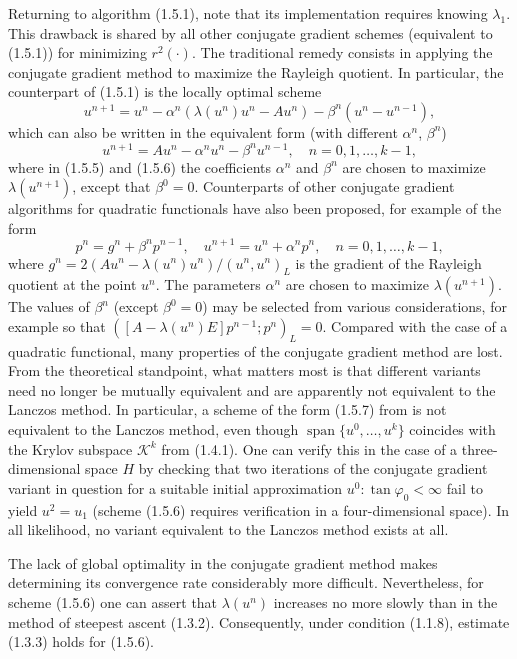 \documentclass[11pt,oneside]{book}
\newcommand{\myspan}{\operatorname{span}}
\begin{document}
Returning to algorithm (1.5.1), note that its implementation requires knowing $\lambda_1$. This drawback is shared by all other conjugate gradient schemes (equivalent to (1.5.1)) for minimizing $r^2(\cdot)$. The traditional remedy consists in applying the conjugate gradient method to maximize the Rayleigh quotient. In particular, the counterpart of (1.5.1) is the locally optimal scheme
\[
u^{n+1} = u^n - \alpha^n (\lambda(u^n)u^n - Au^n) - \beta^n (u^n - u^{n-1}), \tag{1.5.5}
\]
which can also be written in the equivalent form (with different $\alpha^n$, $\beta^n$)
\[
u^{n+1} = Au^n - \alpha^n u^n - \beta^n u^{n-1}, \quad n = 0, 1, \ldots, k - 1, \tag{1.5.6}
\]
where in (1.5.5) and (1.5.6) the coefficients $\alpha^n$ and $\beta^n$ are chosen to maximize $\lambda(u^{n+1})$, except that $\beta^0 = 0$. Counterparts of other conjugate gradient algorithms for quadratic functionals have also been proposed, for example of the form
\[
p^n = g^n + \beta^n p^{n-1}, \quad u^{n+1} = u^n + \alpha^n p^n, \quad n = 0, 1, \ldots, k - 1, \tag{1.5.7}
\]
where $g^n = 2(Au^n - \lambda(u^n)u^n) / (u^n, u^n)_L$ is the gradient of the Rayleigh quotient at the point $u^n$. The parameters $\alpha^n$ are chosen to maximize $\lambda(u^{n+1})$. The values of $\beta^n$ (except $\beta^0 = 0$) may be selected from various considerations, for example so that $([A - \lambda(u^n)E]p^{n-1}; p^n)_L = 0$. Compared with the case of a quadratic functional, many properties of the conjugate gradient method are lost. From the theoretical standpoint, what matters most is that different variants need no longer be mutually equivalent and are apparently not equivalent to the Lanczos method. In particular, a scheme of the form (1.5.7) from \citep{CullumWilloughby1985} is not equivalent to the Lanczos method, even though $\myspan\{u^0, \ldots, u^k\}$ coincides with the Krylov subspace $\mathcal{K}^k$ from (1.4.1). One can verify this in the case of a three-dimensional space $H$ by checking that two iterations of the conjugate gradient variant in question for a suitable initial approximation $u^0 : \tan\varphi_0 < \infty$ fail to yield $u^2 = u_1$ (scheme (1.5.6) requires verification in a four-dimensional space). In all likelihood, no variant equivalent to the Lanczos method exists at all.

The lack of global optimality in the conjugate gradient method makes determining its convergence rate considerably more difficult. Nevertheless, for scheme (1.5.6) one can assert that $\lambda(u^n)$ increases no
more slowly than in the method of steepest ascent (1.3.2). Consequently, under condition (1.1.8), estimate (1.3.3) holds for (1.5.6).
\end{document}
